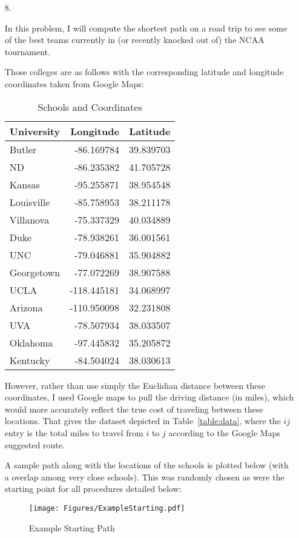 \documentclass[12pt]{article}
\theoremstyle{plain}
\theoremstyle{definition}
\theoremstyle{remark}
\begin{document}
\begin{enumerate}
  \item[8.] %

    In this problem, I will compute the shortest path on a road trip to
    see some of the best teams currently in (or recently knocked out of)
    the NCAA tournament.

    Those colleges are as follows with the corresponding latitude and
    longitude coordinates taken from Google Maps:
    \begin{table}[htpb!]
      \centering
      \begin{tabular}{l|rr}
      University & Longitude & Latitude \\ \hline\hline
      Butler     & -86.169784  & 39.839703 \\
      ND         & -86.235382  & 41.705728 \\
      Kansas     & -95.255871  & 38.954548 \\
      Louisville & -85.758953  & 38.211178 \\
      Villanova  & -75.337329  & 40.034889 \\
      Duke       & -78.938261  & 36.001561 \\
      UNC        & -79.046881  & 35.904882 \\
      Georgetown & -77.072269  & 38.907588 \\
      UCLA       & -118.445181 & 34.068997 \\
      Arizona    & -110.950098 & 32.231808 \\
      UVA        & -78.507934  & 38.033507 \\
      Oklahoma   & -97.445832  & 35.205872 \\
      Kentucky   & -84.504024  & 38.030613 \\
      \end{tabular}
      \caption{Schools and Coordinates}
      \label{table:latlon}
    \end{table}

    However, rather than use simply the Euclidian distance between these
    coordinates, I used Google maps to pull the driving distance (in
    miles), which would more accurately reflect the true cost of
    traveling between these locations. That gives the dataset depicted
    in Table~\ref{table:data}, where the $ij$ entry is the total miles
    to travel from $i$ to $j$ according to the Google Maps suggested
    route.

    A sample path along with the locations of the schools is plotted
    below (with a overlap among very close schools). This was randomly
    chosen as were the starting point for all procedures detailed below:
    \begin{figure}[htpb!]
      \centering
      \caption{Example Starting Path}
      \label{fig:q8.0}
      \texttt{[image: Figures/ExampleStarting.pdf]}
    \end{figure}


\end{enumerate}
\end{document}
